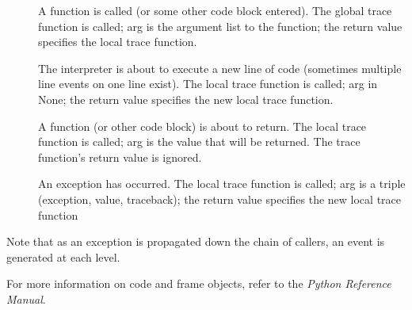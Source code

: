 \begin{description}

\item[]
A function is called (or some other code block entered).  The global
trace function is called; arg is the argument list to the function;
the return value specifies the local trace function.

\item[]
The interpreter is about to execute a new line of code (sometimes
multiple line events on one line exist).  The local trace function is
called; arg in None; the return value specifies the new local trace
function.

\item[]
A function (or other code block) is about to return.  The local trace
function is called; arg is the value that will be returned.  The trace
function's return value is ignored.

\item[]
An exception has occurred.  The local trace function is called; arg is
a triple (exception, value, traceback); the return value specifies the
new local trace function

\end{description}

Note that as an exception is propagated down the chain of callers, an
 event is generated at each level.

For more information on code and frame objects, refer to the
\emph{Python Reference Manual}.
